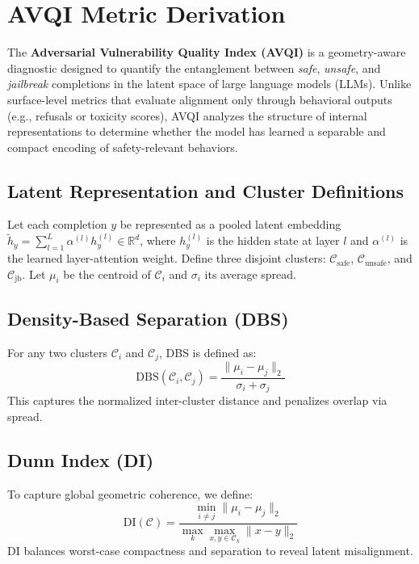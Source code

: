 \section{AVQI Metric Derivation}
\label{sec:appendix_avqi}

The \textbf{Adversarial Vulnerability Quality Index (AVQI)} is a geometry-aware diagnostic designed to quantify the entanglement between \emph{safe}, \emph{unsafe}, and \emph{jailbreak} completions in the latent space of large language models (LLMs). Unlike surface-level metrics that evaluate alignment only through behavioral outputs (e.g., refusals or toxicity scores), AVQI analyzes the structure of internal representations to determine whether the model has learned a separable and compact encoding of safety-relevant behaviors.

\subsection*{Latent Representation and Cluster Definitions}
Let each completion $y$ be represented as a pooled latent embedding $\tilde{h}_y = \sum_{l=1}^L \alpha^{(l)} h_y^{(l)} \in \mathbb{R}^d$, where $h_y^{(l)}$ is the hidden state at layer $l$ and $\alpha^{(l)}$ is the learned layer-attention weight. Define three disjoint clusters:
$\mathcal{C}_{\text{safe}}$, $\mathcal{C}_{\text{unsafe}}$, and $\mathcal{C}_{\text{jb}}$. Let $\mu_i$ be the centroid of $\mathcal{C}_i$ and $\sigma_i$ its average spread.

\subsection*{Density-Based Separation (DBS)}
For any two clusters $\mathcal{C}_i$ and $\mathcal{C}_j$, DBS is defined as:
\[ \mathrm{DBS}(\mathcal{C}_i, \mathcal{C}_j) = \frac{\| \mu_i - \mu_j \|_2}{\sigma_i + \sigma_j} \]
This captures the normalized inter-cluster distance and penalizes overlap via spread.

\subsection*{Dunn Index (DI)}
To capture global geometric coherence, we define:
\[ \mathrm{DI}(\mathcal{C}) = \frac{\min_{i \ne j} \| \mu_i - \mu_j \|_2}{\max_k \max_{x,y \in \mathcal{C}_k} \|x - y\|_2} \]
DI balances worst-case compactness and separation to reveal latent misalignment.



